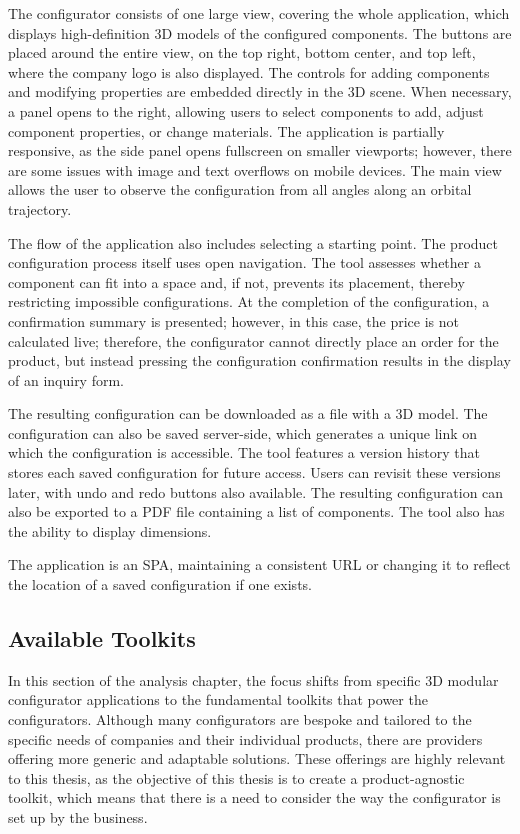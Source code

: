 The configurator consists of one large view, covering the whole application, which displays high-definition 3D models of the configured components. The buttons are placed around the entire view, on the top right, bottom center, and top left, where the company logo is also displayed.  The controls for adding components and modifying properties are embedded directly in the 3D scene. When necessary, a panel opens to the right, allowing users to select components to add, adjust component properties, or change materials. The application is partially responsive, as the side panel opens fullscreen on smaller viewports; however, there are some issues with image and text overflows on mobile devices. The main view allows the user to observe the configuration from all angles along an orbital trajectory.

The flow of the application also includes selecting a starting point. The product configuration process itself uses open navigation. The tool assesses whether a component can fit into a space and, if not, prevents its placement, thereby restricting impossible configurations. At the completion of the configuration, a confirmation summary is presented; however, in this case, the price is not calculated live; therefore, the configurator cannot directly place an order for the product, but instead pressing the configuration confirmation results in the display of an inquiry form.

The resulting configuration can be downloaded as a file with a 3D model. The configuration can also be saved server-side, which generates a unique link on which the configuration is accessible. The tool features a version history that stores each saved configuration for future access. Users can revisit these versions later, with undo and redo buttons also available. The resulting configuration can also be exported to a PDF file containing a list of components. The tool also has the ability to display dimensions.

The application is an SPA, maintaining a consistent URL or changing it to reflect the location of a saved configuration if one exists.


\subsection{Available Toolkits}

In this section of the analysis chapter, the focus shifts from specific 3D modular configurator applications to the fundamental toolkits that power the configurators. Although many configurators are bespoke and tailored to the specific needs of companies and their individual products, there are providers offering more generic and adaptable solutions. These offerings are highly relevant to this thesis, as the objective of this thesis is to create a product-agnostic toolkit, which means that there is a need to consider the way the configurator is set up by the business.

